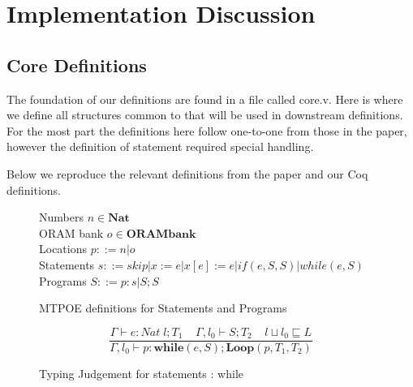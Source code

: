 \documentclass[10pt,  onecolumn]{article}
\begin{document}
\section{ Implementation Discussion }
\label{sec:discussion}



	\subsection{ Core Definitions }
	The foundation of our definitions are found in a file called core.v.
	Here is where we define all structures common to that will be used in downstream definitions.
	For the most part the definitions here follow one-to-one from those in the paper, however the definition of statement required special handling.

	Below we reproduce the relevant definitions from the paper and our Coq definitions.


\begin{figure}
\caption{ MTPOE definitions for Statements and Programs }
\label{fig:mto_rule_while}

	\begin{mdframed}
	Numbers $n \in \textbf{Nat}$\\
	ORAM bank $o \in \textbf{ORAMbank}$\\
	Locations $p ::= n | o$\\
	Statements $ s ::= skip | x := e | x[e] := e | if(e, S, S) | while(e, S)$\\
	Programs $ S ::= p:s | S;S$
	\end{mdframed}

\end{figure}

\begin{figure}
\caption{ Typing Judgement for statements : while}
\label{fig:while_judgement}
\[
\frac{ \Gamma \vdash e : Nat \; l; T_{1}   \;\;\;\;  \Gamma, l_{0} \vdash S;T_{2}  \;\;\;\;   l \sqcup l_{0} \sqsubseteq L }
	{ \Gamma, l_{0} \vdash p:\textbf{while}(e,S);\textbf{Loop}(p,T_{1},T_{2}) }
\]
\end{figure}
\end{document}
